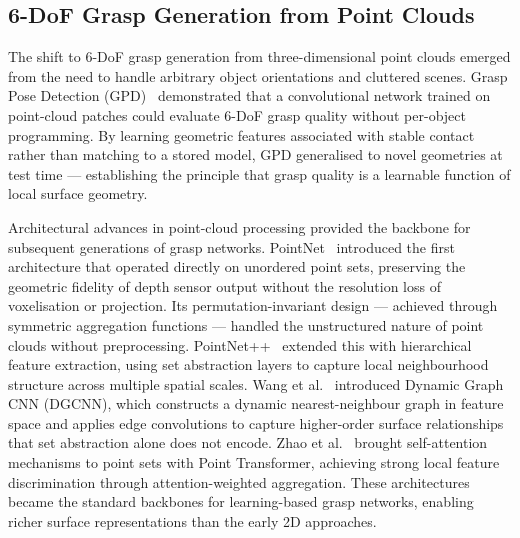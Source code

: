 \documentclass[12pt, a4paper]{report}
\begin{document}
\subsection{6-DoF Grasp Generation from Point Clouds}
\label{sec:6dof-grasping}

The shift to 6-DoF grasp generation from three-dimensional point clouds emerged from the need to handle arbitrary object orientations and cluttered scenes. Grasp Pose Detection (GPD)~\cite{tenPas2017} demonstrated that a convolutional network trained on point-cloud patches could evaluate 6-DoF grasp quality without per-object programming. By learning geometric features associated with stable contact rather than matching to a stored model, GPD generalised to novel geometries at test time --- establishing the principle that grasp quality is a learnable function of local surface geometry.

Architectural advances in point-cloud processing provided the backbone for subsequent generations of grasp networks. PointNet~\cite{qi2017pointnet} introduced the first architecture that operated directly on unordered point sets, preserving the geometric fidelity of depth sensor output without the resolution loss of voxelisation or projection. Its permutation-invariant design --- achieved through symmetric aggregation functions --- handled the unstructured nature of point clouds without preprocessing. PointNet++~\cite{qi2017pointnet2} extended this with hierarchical feature extraction, using set abstraction layers to capture local neighbourhood structure across multiple spatial scales. Wang et al.~\cite{wang2019dgcnn} introduced Dynamic Graph CNN (DGCNN), which constructs a dynamic nearest-neighbour graph in feature space and applies edge convolutions to capture higher-order surface relationships that set abstraction alone does not encode. Zhao et al.~\cite{zhao2021point} brought self-attention mechanisms to point sets with Point Transformer, achieving strong local feature discrimination through attention-weighted aggregation. These architectures became the standard backbones for learning-based grasp networks, enabling richer surface representations than the early 2D approaches.
\end{document}
